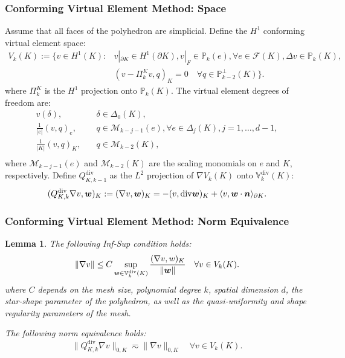 \documentclass[notheorems,serif]{beamer}
\newtheorem{lemma}{\textbf{Lemma}}
\begin{document}
\begin{CJK}{UTF8}{gkai}
\begin{frame}
\frametitle{Conforming Virtual Element Method: Space}
Assume that all faces of the polyhedron are simplicial. Define the $H^1$ conforming virtual element space:
$$
\begin{aligned}
    V_k(K) := \{v \in H^1(K): & v|_{\partial K} \in H^1(\partial K), v|_F \in 
        \mathbb{P}_k(e), \forall e \in \mathcal{F}(K),
    \Delta v \in \mathbb{P}_{k}(K),\\
    & (v-\Pi_k^K v, q)_K = 0 \quad \forall q \in
    \mathbb{P}_{k-2}^{\perp}(K)\}.
\end{aligned}
$$
where $\Pi_k^K$ is the $H^1$ projection onto $\mathbb{P}_k(K)$. 
The virtual element degrees of freedom are:
$$
\begin{aligned} 
    v(\delta), & \quad \delta \in \mathcal{\Delta}_0(K), \\
    \frac{1}{|e|}(v, q)_{e}, & \quad q \in \mathcal{M}_{k-j-1}(e), \forall e \in
    \Delta_j(K), j = 1, \dots, d-1,\\
    \frac{1}{|K|}(v, q)_{K}, & \quad q\in \mathcal{M}_{k-2}(K), \\
\end{aligned}
$$
where $\mathcal{M}_{k-j-1}(e)$ and $\mathcal{M}_{k-2}(K)$ are the scaling monomials on $e$ and $K$, respectively. 
Define $Q_{K, k-1}^{\mathrm{div}}$ as the $L^2$ projection of $\nabla V_k(K)$ onto
$\mathbb{V}^{\mathrm{div}}_{k}(K)$:
$$
(Q_{K, k}^{\mathrm{div}}\nabla v, \boldsymbol{w})_K := (\nabla v,
\boldsymbol{w})_K = -(v, \mathrm{div} \boldsymbol{w})_K + \langle v, \boldsymbol{w} 
\cdot \boldsymbol{n}\rangle_{\partial K}.
$$
\end{frame}

\begin{frame}
    \frametitle{Conforming Virtual Element Method: Norm Equivalence}
    \begin{lemma}
        The following Inf-Sup condition holds:
        $$
        \|\nabla v\| \leq C \sup_{\boldsymbol{w} \in
        \mathbb{V}^{\mathrm{div}}_{k}(K)}\frac{(\nabla v,
        w)_K}{\|\boldsymbol{w}\|} \quad \forall v \in V_k(K).
        $$
        where $C$ depends on the mesh size, polynomial degree $k$, spatial dimension $d$, the star-shape parameter of the polyhedron, as well as the quasi-uniformity and shape regularity parameters of the mesh.
        
        The following norm equivalence holds:
        $$
        \|Q_{K, k}^{\mathrm{div}}\nabla v\|_{0, K} \eqsim \|\nabla v\|_{0, K} 
        \quad \forall v \in V_k(K).
        $$
    \end{lemma}
\end{frame}


\end{CJK}
\end{document}
